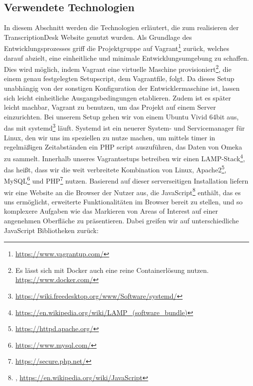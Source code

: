 \documentclass{article}
\begin{document}
\subsection{Verwendete Technologien}
In diesem Abschnitt werden die Technologien erläutert,
die zum realisieren der TranscriptionDesk Website genutzt wurden.
Als Grundlage des Entwicklungsprozesses griff die Projektgruppe auf Vagrant\footnote{
    \url{https://www.vagrantup.com/}}
zurück, welches darauf abzielt, eine einheitliche und minimale Entwicklungsumgebung zu schaffen.
Dies wird möglich, indem Vagrant eine virtuelle Maschine provisioniert\footnote{
    Es lässt sich mit Docker auch eine reine Containerlösung nutzen.\\
    \url{https://www.docker.com/}},
die einem genau festgelegten Setupscript, dem Vagrantfile, folgt.
Da dieses Setup unabhängig von der sonstigen Konfiguration der Entwicklermaschine ist,
lassen sich leicht einheitliche Ausgangsbedingungen etablieren.
Zudem ist es später leicht machbar, Vagrant zu benutzen,
um das Projekt auf einem Server einzurichten.
Bei unserem Setup gehen wir von einem Ubuntu Vivid 64bit aus,
das mit systemd\footnote{
    \url{https://wiki.freedesktop.org/www/Software/systemd/}}
läuft. Systemd ist ein neuerer System- und Servicemanager für Linux,
den wir uns im speziellen zu nutze machen,
um mittels timer in regelmäßigen Zeitabständen
ein PHP script auszuführen,
das Daten von Omeka zu sammelt.
Innerhalb unseres Vagrantsetups betreiben wir einen LAMP-Stack\footnote{\url{https://en.wikipedia.org/wiki/LAMP_(software_bundle)}},
das heißt, dass wir die weit verbreitete Kombination von Linux, Apache2\footnote{
    \url{https://httpd.apache.org/}}, MySQL\footnote{
    \url{https://www.mysql.com/}} und PHP\footnote{
    \url{https://secure.php.net/}} nutzen.
Basierend auf dieser serverseitigen Installation liefern wir eine Website an die Browser der Nutzer aus,
die JavaScript\footnote{
    \cite{Flanagan},
    \url{https://en.wikipedia.org/wiki/JavaScript}} enthält, das es uns ermöglicht,
erweiterte Funktionalitäten im Browser bereit zu stellen,
und so komplexere Aufgaben wie das Markieren von Areas of Interest
auf einer angenehmen Oberfläche zu präsentieren.
Dabei greifen wir auf unterschiedliche JavaScript Bibliotheken zurück:
\end{document}
